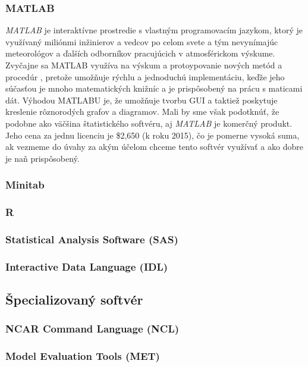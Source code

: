 \subsubsection{MATLAB}
\textit{MATLAB} je interaktívne prostredie s vlastným programovacím jazykom, ktorý je využívaný miliónmi inžinierov a vedcov po celom svete \cite{Matlab} a tým nevynímajúc meteorológov a ďalších odborníkov pracujúcich v atmosférickom výskume. 
Zvyčajne sa MATLAB využíva na výskum a protoypovanie nových metód a procedúr \cite{VerifSoft}, pretože umožňuje rýchlu a jednoduchú implementáciu, keďže jeho súčasťou je mnoho matematických knižníc a je prispôsobený na prácu s maticami dát.
Výhodou MATLABU je, že umožňuje tvorbu GUI a taktiež poskytuje kreslenie rôznorodých grafov a diagramov.
Mali by sme však podotknúť, že podobne ako väčšina štatistického softvéru, aj \textit{MATLAB} je komerčný produkt. Jeho cena za jednu licenciu je \$2,650 (k roku 2015), čo je pomerne vysoká suma, ak vezmeme do úvahy za akým účelom chceme tento softvér využívať a ako dobre je naň prispôsobený.

\subsubsection{Minitab} %


\subsubsection{R}

\subsubsection[SAS]{Statistical Analysis Software (SAS)}

\subsubsection[IDL]{Interactive Data Language (IDL)}

\subsection{Špecializovaný softvér}

\subsubsection[NCL]{NCAR Command Language (NCL)}

\subsubsection[MET]{Model Evaluation Tools (MET)}

